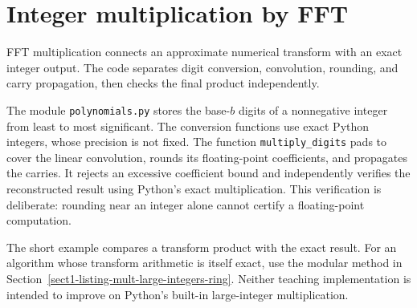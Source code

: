 \begin{listing}[H]
\caption{Multiplication by a linear phase.}
\label{listing-operator_s}
\end{listing}

\begin{listing}[H]
\caption{Bit-reversal indices in linear total work.}
\label{listing-rev_bits}
\end{listing}

\begin{listing}[H]
\caption{Reversing the bits of a single index.}
\label{listing-rev_index}
\end{listing}

\section{Integer multiplication by FFT}
\label{sect1-listing-mult-integers}

FFT multiplication connects an approximate numerical transform with an exact
integer output. The code separates digit conversion, convolution, rounding,
and carry propagation, then checks the final product independently.

The module \texttt{polynomials.py} stores the base-$b$ digits of a
nonnegative integer from least to most significant. The conversion
functions use exact Python integers, whose precision is not fixed.
The function \texttt{multiply\_digits} pads to cover the linear
convolution, rounds its floating-point coefficients, and propagates
the carries. It rejects an excessive coefficient bound and independently
verifies the reconstructed result using Python's exact multiplication.
This verification is deliberate: rounding near an integer alone cannot
certify a floating-point computation.

The short example compares a transform product with the exact result.
For an algorithm whose transform arithmetic is itself exact, use the
modular method in Section~\ref{sect1-listing-mult-large-integers-ring}.
Neither teaching implementation is intended to improve on Python's
built-in large-integer multiplication.
\begin{listing}[H]
\caption{FFT digit convolution and carry propagation, with exact verification.}
\label{listing-mult-integers}
\end{listing}

\begin{listing}[H]
\caption{Exact conversion from a nonnegative integer to base-$b$ digits.}
\label{listing-number2vector}
\end{listing}

